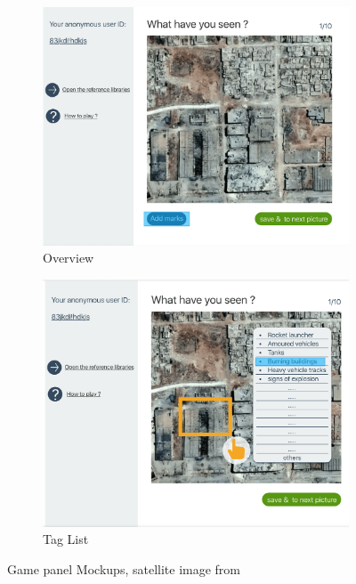 \begin{figure}[H]
    \centering
    \begin{subfigure}[b]{0.45\textwidth}
        \centering
        \includegraphics[width=\textwidth]{figures/function-player-0}
        \caption{Overview}
        \label{fig:player0}
    \end{subfigure}
    \hfill
    \begin{subfigure}[b]{0.45\textwidth}
        \centering
        \includegraphics[width=\textwidth]{figures/function-player-1}
        \caption{Tag List}
        \label{fig:player1}
    \end{subfigure}
    \caption{Game panel Mockups, satellite image from  \cite{satellite-photo-1}}
\end{figure}


